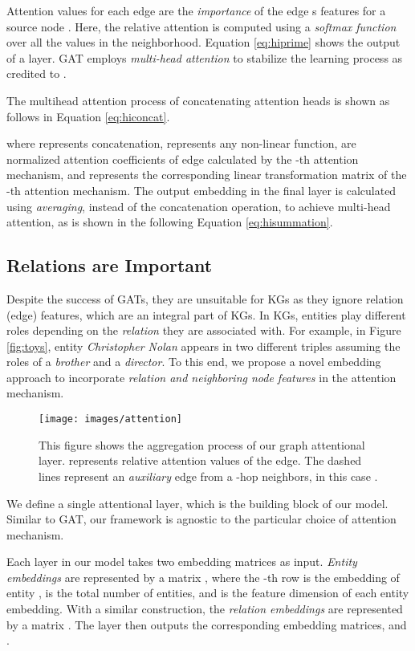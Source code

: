 \documentclass[11pt,a4paper]{article}
\begin{document}
Attention values for each edge are the \textit{importance} of the edge s features for a source node . Here, the relative attention  is computed using a \emph{softmax function} over all the values in the neighborhood.
Equation \ref{eq:hiprime} shows the output of a layer. GAT employs \emph{multi-head attention} to stabilize the learning process as credited to \cite{NIPS2017_7181}. 

The multihead attention process of concatenating  attention heads is shown as follows in Equation \ref{eq:hiconcat}. 

where  represents concatenation,  represents any non-linear function,  are normalized attention coefficients of edge  calculated by the -th attention mechanism, and  represents the corresponding linear transformation matrix of the -th 
attention mechanism.
The output embedding in the final layer is calculated using \emph{averaging}, instead of the concatenation operation, to achieve multi-head attention, as is shown in the following Equation \ref{eq:hisummation}.


\subsection{Relations are Important}
Despite the success of GATs, they are unsuitable for KGs as they ignore relation (edge) features, which are an 
integral part of KGs. In KGs, entities play different roles depending on the \emph{relation} they are associated with.
For example, in Figure \ref{fig:toys}, entity \textit{Christopher Nolan} appears in two different triples assuming the roles of a
\emph{brother} and a \emph{director}. To this end, we propose a novel embedding approach to incorporate \textit{relation and neighboring node features} in the attention mechanism.
\begin{figure}
  \texttt{[image: images/attention]}
  \caption{This figure shows the aggregation process of our graph attentional layer.  represents relative attention values of the edge. 
The dashed lines represent an \textit{auxiliary} edge from a -hop neighbors, in this case . }
  \label{fig:attentionex}
\end{figure}
We define a single attentional layer, which is the building block of our model. Similar to GAT, our framework is agnostic to the particular choice of attention mechanism.

Each layer in our model takes two embedding matrices as input. \emph{Entity embeddings} are represented by a matrix , where the -th row is the embedding of entity  ,  is the total number of entities, and  is the feature dimension of each entity embedding. 
With a similar construction, the \emph{relation embeddings} are represented by a matrix . The layer then outputs the corresponding embedding matrices,  and  .
\end{document}
